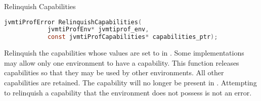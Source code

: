 \begin{apidef}{Relinquish Capabilities}
\begin{lstlisting}[language=C]
jvmtiProfError RelinquishCapabilities(
            jvmtiProfEnv* jvmtiprof_env,
            const jvmtiProfCapabilities* capabilities_ptr);
\end{lstlisting}

\begin{apidesc}
Relinquish the capabilities whose values are set to  in . Some implementations may allow only one environment to have a capability. This function releases capabilities so that they may be used by other environments. All other capabilities are retained. The capability will no longer be present in . Attempting to relinquish a capability that the environment does not possess is not an error. 
\end{apidesc}

\begin{apiphase}
\apiphaseonloadlive
\end{apiphase}

\begin{apicap}
\apicaprequired
\end{apicap}

\begin{apiparam}
\end{apiparam}

\apireturnempty

\begin{apierror}
\end{apierror}
\end{apidef}
